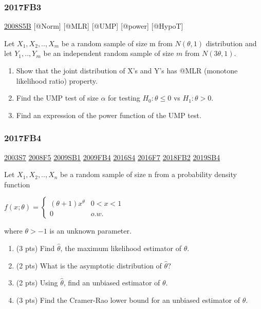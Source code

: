\documentclass[6pt,Portrait]{article}
\begin{document}
\hypertarget{fb3-3}{%
\subsubsection{2017FB3}\label{fb3-3}}

\protect\hyperlink{s5b}{2008S5B} {[}@Norm{]} {[}@MLR{]} {[}@UMP{]}
{[}@power{]} {[}@HypoT{]}

Let \(X_1,X_2,..,X_{m}\) be a random sample of size m from
\(N(\theta,1)\) distribution and let \(Y_1,..,Y_m\) be an independent
random sample of size \(m\) from \(N(3\theta,1)\).

\begin{enumerate}
\def\labelenumi{(\alph{enumi})}
\item
  Show that the joint distribution of X's and Y's has @MLR (monotone
  likelihood ratio) property.
\item
  Find the UMP test of size \(\alpha\) for testing \(H_0:\theta\le0\) vs
  \(H_1:\theta>0\).
\item
  Find an expression of the power function of the UMP test.
\end{enumerate}

\hypertarget{fb4-3}{%
\subsubsection{2017FB4}\label{fb4-3}}

\protect\hyperlink{s7}{2003S7} \protect\hyperlink{f5-3}{2008F5}
\protect\hyperlink{sb1}{2009SB1} \protect\hyperlink{fb4}{2009FB4}
\protect\hyperlink{s4-4}{2016S4} \protect\hyperlink{f7-5}{2016F7}
\protect\hyperlink{fb2-4}{2018FB2} \protect\hyperlink{sb4-2}{2019SB4}

Let \(X_1,X_2,..,X_n\) be a random sample of size n from a probability
density function

\(f(x;\theta)=\begin{cases}(\theta+1)x^\theta& 0<x<1\\0& o.w.\end{cases}\)

where \(\theta>-1\) is an unknown parameter.

\begin{enumerate}
\def\labelenumi{(\alph{enumi})}
\item
  (3 pts) Find \(\hat\theta\), the maximum likelihood estimator of
  \(\theta\).
\item
  (2 pts) What is the asymptotic distribution of \(\hat\theta\)?
\item
  (2 pts) Using \(\hat\theta\), find an unbiased estimator of
  \(\theta\).
\item
  (3 pts) Find the Cramer-Rao lower bound for an unbiased estimator of
  \(\theta\).
\end{enumerate}
\end{document}
